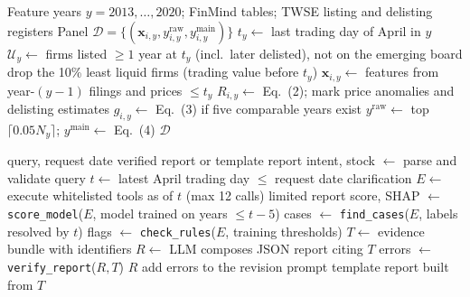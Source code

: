 \documentclass[conference]{IEEEtran}
\begin{document}
\begin{algorithm}[t]
\caption{Point-in-Time Panel Construction}
\label{alg:pit}
\small
\renewcommand{\algorithmicrequire}{\textbf{Input:}}
\renewcommand{\algorithmicensure}{\textbf{Output:}}
\begin{algorithmic}[1]
\REQUIRE Feature years $y=2013,\dots,2020$; FinMind tables; TWSE listing and delisting registers
\ENSURE Panel $\mathcal{D}=\{(\mathbf{x}_{i,y}, y^{\text{raw}}_{i,y}, y^{\text{main}}_{i,y})\}$
  \STATE $t_y \leftarrow$ last trading day of April in $y$
  \STATE $\mathcal{U}_y \leftarrow$ firms listed $\ge 1$ year at $t_y$ (incl.\ later delisted), not on the emerging board
  \STATE drop the 10\% least liquid firms (trading value before $t_y$)
    \STATE $\mathbf{x}_{i,y} \leftarrow$ features from year-$(y{-}1)$ filings and prices $\le t_y$
    \STATE $R_{i,y} \leftarrow$ Eq.~(2); mark price anomalies and delisting estimates
    \STATE $g_{i,y} \leftarrow$ Eq.~(3) if five comparable years exist
  \ENDFOR
  \STATE $y^{\text{raw}} \leftarrow$ top $\lceil 0.05N_y \rceil$; $y^{\text{main}} \leftarrow$ Eq.~(4)
\ENDFOR
\RETURN $\mathcal{D}$
\end{algorithmic}
\end{algorithm}

\begin{algorithm}[t]
\caption{Agent Query with Three-Round Verification}
\label{alg:agent}
\small
\renewcommand{\algorithmicrequire}{\textbf{Input:}}
\renewcommand{\algorithmicensure}{\textbf{Output:}}
\begin{algorithmic}[1]
\REQUIRE query, request date
\ENSURE verified report or template report
\STATE intent, stock $\leftarrow$ parse and validate query
\STATE $t \leftarrow$ latest April trading day $\le$ request date
 \RETURN clarification \ENDIF
\STATE $E \leftarrow$ execute whitelisted tools as of $t$ (max 12 calls)
 \RETURN limited report \ENDIF
\STATE score, SHAP $\leftarrow$ \texttt{score\_model}($E$, model trained on years $\le t-5$)
\STATE cases $\leftarrow$ \texttt{find\_cases}($E$, labels resolved by $t$)
\STATE flags $\leftarrow$ \texttt{check\_rules}($E$, training thresholds)
\STATE $T \leftarrow$ evidence bundle with identifiers
  \STATE $R \leftarrow$ LLM composes JSON report citing $T$
  \STATE errors $\leftarrow$ \texttt{verify\_report}($R, T$)
   \RETURN $R$ \ENDIF
  \STATE add errors to the revision prompt
\ENDFOR
\RETURN template report built from $T$
\end{algorithmic}
\end{algorithm}
\end{document}
